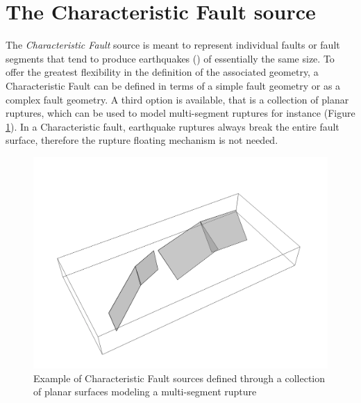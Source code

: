 \section{The Characteristic Fault source}
The \textit{Characteristic Fault} source is meant to represent individual faults
or fault segments that tend to produce earthquakes
(\cite{schwartscoppersmith1984}) of essentially the same size. To offer the
greatest flexibility in the definition of the associated geometry, a
Characteristic Fault can be defined in terms of a simple fault geometry or as a
complex fault geometry. A third option is available, that is a collection of
planar ruptures, which can be used to model multi-segment ruptures for instance
(Figure \ref{fig:CharacteristicFaultSource}). In a Characteristic fault,
earthquake ruptures always break the entire fault surface, therefore the rupture
floating mechanism is not needed.  
\begin{figure}
\centering
\includegraphics[width=14cm]{./Pictures/CharacteristicFaultSource.pdf}
\caption{Example of Characteristic Fault sources defined through a collection of
planar surfaces modeling a multi-segment rupture}
\label{fig:CharacteristicFaultSource}
\end{figure}
